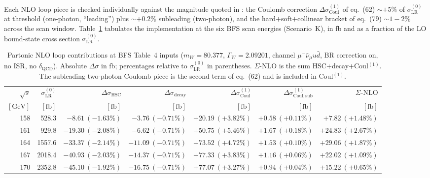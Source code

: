 \documentclass[11pt,a4paper]{article}
\newcommand{\mW}{m_W}
\newcommand{\GammaW}{\Gamma_W}
\newcommand{\sqrts}{\sqrt{s}}
\newcommand{\munuqq}{\mu^-\bar\nu_\mu u\bar d}
\begin{document}
Each NLO loop piece is checked individually against the magnitude
quoted in \cite{BFSnlo}: the Coulomb correction
$\Delta\sigma_\mathrm{Coul}^{(1)}$ of eq.~(62) ${\sim}{+}5\%$ of
$\sigma_\mathrm{LR}^{(0)}$ at threshold (one-photon, ``leading'')
plus ${\sim}{+}0.2\%$ subleading (two-photon), and the
hard${+}$soft${+}$collinear bracket of eq.~(79) ${\sim}1{-}2\%$ across
the scan window. Table~\ref{tab:val-nlo-pieces} tabulates the
implementation at the six BFS scan energies (Scenario~K), in fb and
as a fraction of the LO bound-state cross section
$\sigma_\mathrm{LR}^{(0)}$.

\begin{table}[h]
\centering
\small
\caption{Partonic NLO loop contributions at BFS Table~4 inputs
($\mW=80.377$, $\GammaW=2.09201$, channel $\munuqq$, BR correction on,
no ISR, no $\delta_\mathrm{QCD}$). Absolute $\Delta\sigma$ in fb;
percentages relative to $\sigma_\mathrm{LR}^{(0)}$ in parentheses.
$\Sigma$-NLO is the sum HSC${+}$decay${+}$Coul$^{(1)}$. The
subleading two-photon Coulomb piece is the second term of eq.~(62)
and is included in Coul$^{(1)}$.}
\label{tab:val-nlo-pieces}
\setlength{\tabcolsep}{4pt}
\begin{tabular}{r r r r r r r}
\toprule
$\sqrts$ & $\sigma_\mathrm{LR}^{(0)}$
 & $\Delta\sigma_\mathrm{HSC}$
 & $\Delta\sigma_\mathrm{decay}$
 & $\Delta\sigma_\mathrm{Coul}^{(1)}$
 & $\Delta\sigma_\mathrm{Coul,sub}^{(1)}$
 & $\Sigma$-NLO \\
$[\mathrm{GeV}]$ & $[\mathrm{fb}]$ & $[\mathrm{fb}]$ & $[\mathrm{fb}]$
 & $[\mathrm{fb}]$ & $[\mathrm{fb}]$ & $[\mathrm{fb}]$ \\
\midrule
158 &  528.3 & $-8.61\ (-1.63\%)$ & $-3.76\ (-0.71\%)$ & $+20.19\ (+3.82\%)$ & $+0.58\ (+0.11\%)$ & $+7.82\ (+1.48\%)$ \\
161 &  929.8 & $-19.30\ (-2.08\%)$ & $-6.62\ (-0.71\%)$ & $+50.75\ (+5.46\%)$ & $+1.67\ (+0.18\%)$ & $+24.83\ (+2.67\%)$ \\
164 & 1557.6 & $-33.37\ (-2.14\%)$ & $-11.09\ (-0.71\%)$ & $+73.52\ (+4.72\%)$ & $+1.53\ (+0.10\%)$ & $+29.06\ (+1.87\%)$ \\
167 & 2018.4 & $-40.93\ (-2.03\%)$ & $-14.37\ (-0.71\%)$ & $+77.33\ (+3.83\%)$ & $+1.16\ (+0.06\%)$ & $+22.02\ (+1.09\%)$ \\
170 & 2352.8 & $-45.10\ (-1.92\%)$ & $-16.75\ (-0.71\%)$ & $+77.07\ (+3.27\%)$ & $+0.94\ (+0.04\%)$ & $+15.22\ (+0.65\%)$ \\
\bottomrule
\end{tabular}
\end{table}
\end{document}
